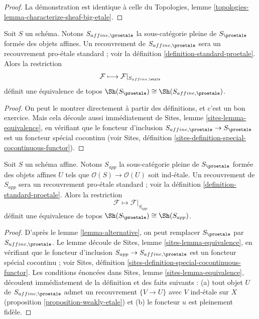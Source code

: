 \begin{proof}
La démonstration est identique à celle du
Topologies, lemme \ref{topologies-lemma-characterize-sheaf-big-etale}.
\end{proof}

\begin{lemma}
\label{lemma-alternative}
Soit $S$ un schéma. Notons $S_{affine, \proetale}$ la sous-catégorie pleine
de $S_\proetale$ formée des objets affines. Un recouvrement de
$S_{affine, \proetale}$ sera un recouvrement pro-\'etale standard ; voir la
définition \ref{definition-standard-proetale}.
Alors la restriction
$$
\mathcal{F} \longmapsto \mathcal{F}|_{S_{affine, \etale}}
$$
définit une équivalence de topos
$\Sh(S_\proetale) \cong \Sh(S_{affine, \proetale})$.
\end{lemma}

\begin{proof}
On peut le montrer directement à partir des définitions, et c'est un bon exercice.
Mais cela découle aussi immédiatement de
Sites, lemme \ref{sites-lemma-equivalence},
en vérifiant que le foncteur d'inclusion
$S_{affine, \proetale} \to S_\proetale$
est un foncteur spécial cocontinu (voir
Sites, définition \ref{sites-definition-special-cocontinuous-functor}).
\end{proof}

\begin{lemma}
\label{lemma-affine-alternative}
Soit $S$ un schéma affine. Notons $S_{app}$ la sous-catégorie pleine
de $S_\proetale$ formée des objets affines $U$ tels que
$\mathcal{O}(S) \to \mathcal{O}(U)$ soit ind-\'etale. Un recouvrement de
$S_{app}$ sera un recouvrement pro-\'etale standard ; voir la
définition \ref{definition-standard-proetale}.
Alors la restriction
$$
\mathcal{F} \longmapsto \mathcal{F}|_{S_{app}}
$$
définit une équivalence de topos $\Sh(S_\proetale) \cong \Sh(S_{app})$.
\end{lemma}

\begin{proof}
D'après le lemme \ref{lemma-alternative}, on peut remplacer $S_\proetale$ par
$S_{affine, \proetale}$.
Le lemme découle de Sites, lemme \ref{sites-lemma-equivalence},
en vérifiant que le foncteur d'inclusion $S_{app} \to S_{affine, \proetale}$
est un foncteur spécial cocontinu ; voir
Sites, définition \ref{sites-definition-special-cocontinuous-functor}.
Les conditions énoncées dans Sites, lemme \ref{sites-lemma-equivalence},
découlent immédiatement de la définition et des faits suivants :
(a) tout objet $U$ de $S_{affine, \proetale}$ admet un recouvrement
$\{V \to U\}$ avec $V$ ind-\'etale sur $X$
(proposition \ref{proposition-weakly-etale})
et (b) le foncteur $u$ est pleinement fidèle.
\end{proof}

